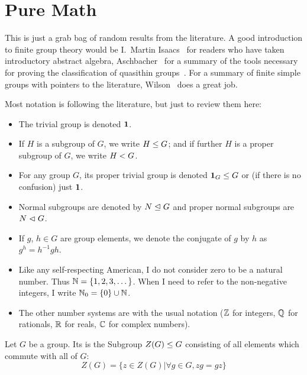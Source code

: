 \chapter{Pure Math}\label{chapter:pure-math}

\M
This is just a grab bag of random results from the literature. A good
introduction to finite group theory would be I.~Martin
Isaacs~\cite{isaacs2008finite} for readers who have taken introductory
abstract algebra, Aschbacher~\cite{aschbacher2000finite} for a summary
of the tools necessary for proving the classification of quasithin groups~\cite{aschbacher2004classification1,aschbacher2004classification2}.
For a summary of finite simple groups with pointers to the literature,
Wilson~\cite{wilson2009finite} does a great job.

 Most notation is following the literature, but just to
review them here:
\begin{itemize}%
\item The trivial group is denoted $\mathbf{1}$.
\item If $H$ is a subgroup of $G$, we write $H\leq G$; and if
  further $H$ is a proper subgroup of $G$, we write $H< G$.
\item For any group $G$, its proper trivial group is denoted
  $\mathbf{1}_{G}\leq G$ or (if there is no confusion) just
  $\mathbf{1}$.
\item Normal subgroups are denoted by $N\trianglelefteq G$ and proper
  normal subgroups are $N\mathrel{\lhd} G$.
\item If $g$, $h\in G$ are group elements, we denote the conjugate of $g$ by
$h$ as $g^{h}=h^{-1}gh$.
\item Like any self-respecting American, I do not consider zero to be a
natural number. Thus $\mathbb{N}=\{1,2,3,\dots\}$. When I need to refer to the
non-negative integers, I write $\mathbb{N}_{0}=\{0\}\cup\mathbb{N}$.
\item The other number systems are with the usual notation ($\mathbb{Z}$ for
  integers, $\mathbb{Q}$ for rationals, $\mathbb{R}$ for reals, $\mathbb{C}$ for complex numbers).
\end{itemize}

\begin{definition}
Let $G$ be a group. Its  is the Subgroup $Z(G)\leq G$
consisting of all elements which commute with all of $G$:
\begin{equation*}
Z(G) = \{z\in Z(G) | \forall g\in G, zg=gz\}
\end{equation*}
\end{definition}

